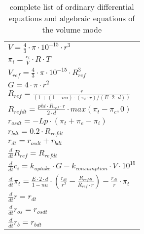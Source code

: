 \begin{table} [h]
	
	\begin{center} 
		\caption{complete list of ordinary differential equations and algebraic equations of the volume mode}
		\begin{tabular} {l}
			\toprule
			$V = \frac{4}{3}\cdot \pi  \cdot 10^{-15} \cdot r^3$ \\
			$\pi_i = \frac{c_i}{V} \cdot R\cdot T$\\
			$V_{ref} =  \frac{4}{3} \cdot \pi \cdot 10^{-15} \cdot R_{ref}^3$\\
			$G = 4 \cdot  \pi \cdot r^2$\\
			$R_{ref} = \frac{r}{(1 + (1 - nu)\cdot (\pi_t \cdot r) / (E\cdot 2\cdot d))} $\\
			$R_{refdt}= \frac{phi\cdot R_{ref}\cdot r }{2\cdot d} \cdot max(\pi_t- \pi_c, 0)$\\
			$r_{osdt }= - Lp\cdot (\pi_t + \pi_e - \pi_i)$\\
			$r_{bdt} = 0.2\cdot R_{refdt}$\\
			$r_{dt} = r_{osdt} + r_{bdt}$  \\
			$\frac{d}{dt} R_{ref} = R_{refdt}$\\
			$\frac{d}{dt}  c_i = k_{uptake}\cdot G - k_{consumption}\cdot V\cdot 10^{15}$\\
			$\frac{d}{dt} \pi_t = \frac{E\cdot 2\cdot d }{1 - nu} \cdot (\frac{r_{dt}}{r^2 } - \frac{R_{refdt}}{R_{ref} \cdot r}) - \frac{r_{dt}}{ r} \cdot \pi_t$\\
			$\frac{d}{dt}  r = r_{dt}$\\
			$\frac{d}{dt} r_{os} = r_{osdt}$\\
			$\frac{d}{dt}  r_b = r_{bdt}$\\
			
			\bottomrule
		\end{tabular}
		\label{equationsVolume}
	\end{center}
\end{table}


